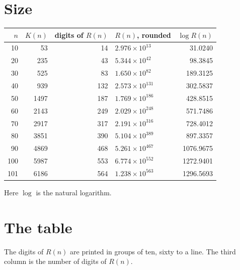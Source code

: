\documentclass[10pt]{article}
\begin{document}
\section*{Size}
\begin{center}
\begin{tabular}{rrrlr}
\toprule
$n$ & $K(n)$ & digits of $R(n)$ & $R(n)$, rounded & $\log R(n)$\\
\midrule
10 & 53 & 14 & $2.976\times10^{13}$ & 31.0240\\
20 & 235 & 43 & $5.344\times10^{42}$ & 98.3845\\
30 & 525 & 83 & $1.650\times10^{82}$ & 189.3125\\
40 & 939 & 132 & $2.573\times10^{131}$ & 302.5837\\
50 & 1497 & 187 & $1.769\times10^{186}$ & 428.8515\\
60 & 2143 & 249 & $2.029\times10^{248}$ & 571.7486\\
70 & 2917 & 317 & $2.191\times10^{316}$ & 728.4012\\
80 & 3851 & 390 & $5.104\times10^{389}$ & 897.3357\\
90 & 4869 & 468 & $5.261\times10^{467}$ & 1076.9675\\
100 & 5987 & 553 & $6.774\times10^{552}$ & 1272.9401\\
101 & 6186 & 564 & $1.238\times10^{563}$ & 1296.5693\\
\bottomrule
\end{tabular}
\end{center}
Here $\log$ is the natural logarithm.

\section*{The table}
The digits of $R(n)$ are printed in groups of ten, sixty to a line. The third column is the number of digits of $R(n)$.
\end{document}
